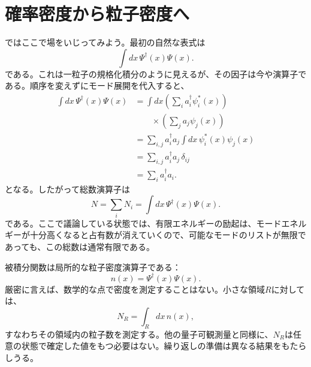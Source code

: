 \begin{classroomqa}
\end{classroomqa}

\section{確率密度から粒子密度へ}

ではここで場をいじってみよう。最初の自然な表式は
\begin{equation}
\int dx\,\Psi^\dagger(x)\Psi(x).
\end{equation}
である。これは一粒子の規格化積分のように見えるが、その因子は今や演算子である。順序を変えずにモード展開を代入すると、
\begin{align}
\int dx\,\Psi^\dagger(x)\Psi(x)
&=\int dx
\left(\sum_i a_i^\dagger\psi_i^*(x)\right)\\
&\qquad\times\left(\sum_j a_j\psi_j(x)\right) \\
&=\sum_{i,j}a_i^\dagger a_j
\int dx\,\psi_i^*(x)\psi_j(x) \\
&=\sum_{i,j}a_i^\dagger a_j\,\delta_{ij} \\
&=\sum_i a_i^\dagger a_i.
\label{eq:l07-number-derivation}
\end{align}
となる。したがって総数演算子は
\begin{equation}
N=\sum_i N_i
=\int dx\,\Psi^\dagger(x)\Psi(x).
\label{eq:l07-total-number}
\end{equation}
である。ここで議論している状態では、有限エネルギーの励起は、モードエネルギーが十分高くなると占有数が消えていくので、可能なモードのリストが無限であっても、この総数は通常有限である。

被積分関数は局所的な粒子密度演算子である：
\begin{equation}
n(x)=\Psi^\dagger(x)\Psi(x).
\label{eq:l07-density}
\end{equation}
厳密に言えば、数学的な点で密度を測定することはない。小さな領域\(R\)に対しては、
\begin{equation}
N_R=\int_R dx\,n(x),
\label{eq:l07-regional-number}
\end{equation}
すなわちその領域内の粒子数を測定する。他の量子可観測量と同様に、\(N_R\)は任意の状態で確定した値をもつ必要はない。繰り返しの準備は異なる結果をもたらしうる。

